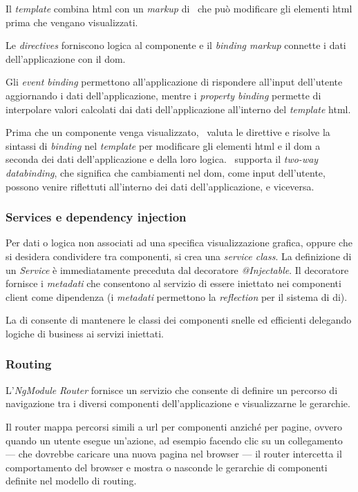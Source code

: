 Il \textit{template} combina \acrshort{html} con un \textit{markup} di \angular~che può modificare gli elementi \acrshort{html} prima che vengano visualizzati.

Le \textit{directives} forniscono logica al componente e il \textit{binding markup} connette i dati dell'applicazione con il \gls{dom}.

Gli \textit{event binding} permettono all'applicazione di rispondere all'input dell'utente aggiornando i dati dell'applicazione, mentre i \textit{property binding} permette di interpolare valori calcolati dai dati dell'applicazione all'interno del \textit{template} \acrshort{html}.

Prima che un componente venga visualizzato, \angular~valuta le direttive e risolve la sintassi di \textit{binding} nel \textit{template} per modificare gli elementi \acrshort{html} e il \acrshort{dom} a seconda dei dati dell'applicazione e della loro logica. \angular~supporta il \textit{two-way databinding}, che significa che cambiamenti nel \acrshort{dom}, come input dell'utente, possono venire riflettuti all'interno dei dati dell'applicazione, e viceversa.

\subsubsection{Services e dependency injection}
\label{chap:client:services}
Per dati o logica non associati ad una specifica visualizzazione grafica, oppure che si desidera condividere tra componenti, si crea una \textit{service class}. La definizione di un \textit{Service} è immediatamente preceduta dal decoratore \textit{@Injectable}. Il decoratore fornisce i \textit{metadati} che consentono al servizio di essere iniettato nei componenti client come dipendenza (i \textit{metadati} permettono la \textit{reflection} per il sistema di \acrshort{di}).

La \gls{di}  consente di mantenere le classi dei componenti snelle ed efficienti delegando logiche di business ai servizi iniettati.

\subsubsection{Routing}

L'\textit{NgModule} \textit{Router} fornisce un servizio che consente di definire un percorso di navigazione tra i diversi componenti dell'applicazione e visualizzarne le gerarchie.

Il router mappa percorsi simili a \acrshort{url} per componenti anziché per pagine, ovvero quando un utente esegue un'azione, ad esempio facendo clic su un collegamento --- che dovrebbe caricare una nuova pagina nel browser --- il router intercetta il comportamento del browser e mostra o nasconde le gerarchie di componenti definite nel modello di routing.

